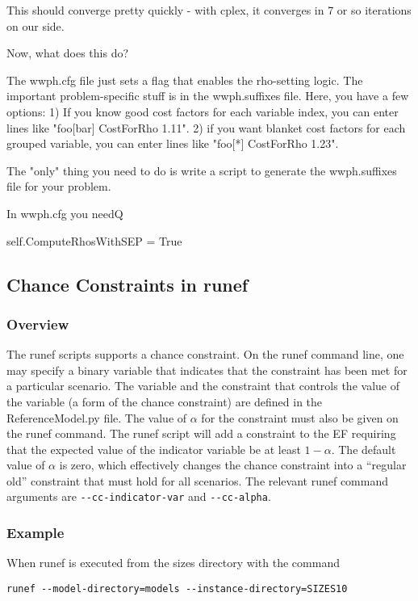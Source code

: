 This should converge pretty quickly - with cplex, it converges in 7 or so iterations on our side.

Now, what does this do?

The wwph.cfg file just sets a flag that enables the rho-setting logic. The important problem-specific stuff is in the wwph.suffixes file. Here, you have a few options:
1) If you know good cost factors for each variable index, you can enter lines like "foo[bar] CostForRho 1.11".
2) if you want blanket cost factors for each grouped variable, you can enter lines like "foo[*] CostForRho 1.23".

The "only" thing you need to do is write a script to generate the wwph.suffixes file for your problem.

In wwph.cfg you needQ

self.ComputeRhosWithSEP = True

\subsection{Chance Constraints in runef}

\subsubsection{Overview}

The runef scripts supports a chance constraint. On the runef command line, one
may specify a binary variable that
indicates that the constraint has been met for a particular scenario. The variable and the
constraint that controls the value of the variable (a form of the chance constraint)
are defined in the ReferenceModel.py file. The value of $\alpha$ for the constraint
must also be given on the runef command. The runef script will add a constraint
to the EF requiring that the expected value of the indicator variable be at least
$1-\alpha$. The default value of $\alpha$ is zero, which effectively changes the chance
constraint into a ``regular old'' constraint that must hold for all scenarios. The 
relevant runef command arguments are \verb|--cc-indicator-var| and \verb|--cc-alpha|. 

\subsubsection{Example}

When runef is executed from the sizes directory with the command

\begin{verbatim}
runef --model-directory=models --instance-directory=SIZES10
\end{verbatim}


